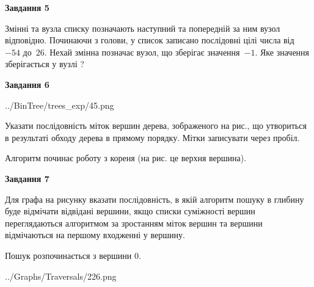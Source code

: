 \documentclass[12pt, ukrainian]{article}
\begin{document}
{\begin {large}
{\begin {center}\textbf{Завдання 5}\end {center}}\par
Змінні  та  вузла списку позначають наступний та попередній за ним вузол відповідно. Починаючи з голови, у список записано послідовні цілі числа від~$-54$ до~$26$. Нехай змінна  позначає вузол, що зберігає значення~$-1$.
Яке значення зберігається у вузлі  ?\par
\newpage

{\begin {center}\textbf{Завдання 6}\end {center}}\par

\begin{center}
	{../BinTree/trees_exp/45.png}
\end{center}
Указати послідовність міток вершин дерева, зображеного на рис., що утвориться в результаті обходу дерева в прямому порядку. Мітки записувати через пробіл.\par Алгоритм починає роботу з кореня (на рис. це верхня вершина).\par
\newpage

{\begin {center}\textbf{Завдання 7}\end {center}}\par
Для графа на рисунку вказати послідовність, в якій алгоритм пошуку в глибину буде відмічати відвідані вершини, якщо списки суміжності вершин переглядаються алгоритмом за зростанням міток вершин та вершини відмічаються на першому вход\-женні у вершину.\par
Пошук розпочинається з вершини 0.\par

\begin{center}
	{../Graphs/Traversals/226.png}
\end{center}\par
\newpage


\end{large}}
\end{document}
